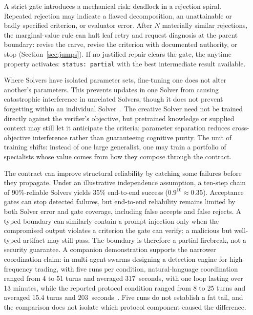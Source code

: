 \documentclass[11pt]{article}
\let\oldtexttt\texttt
\renewcommand{\texttt}[1]{\oldtexttt{\small #1}}
\begin{document}
A strict gate introduces a mechanical risk: deadlock in a rejection spiral. Repeated rejection may indicate a flawed decomposition, an unattainable or badly specified criterion, or evaluator error. After $N$ materially similar rejections, the marginal-value rule can halt leaf retry and request diagnosis at the parent boundary: revise the carve, revise the criterion with documented authority, or stop (Section~\ref{sec:jumps}). If no justified repair clears the gate, the anytime property activates: \texttt{status: partial} with the best intermediate result available.

Where Solvers have isolated parameter sets, fine-tuning one does not alter another's parameters. This prevents updates in one Solver from causing catastrophic interference in unrelated Solvers, though it does not prevent forgetting within an individual Solver~\cite{mccloskey1989}. The creative Solver need not be trained directly against the verifier's objective, but pretrained knowledge or supplied context may still let it anticipate the criteria; parameter separation reduces cross-objective interference rather than guaranteeing cognitive purity. The unit of training shifts: instead of one large generalist, one may train a portfolio of specialists whose value comes from how they compose through the contract.

The contract can improve structural reliability by catching some failures before they propagate. Under an illustrative independence assumption, a ten-step chain of 90\%-reliable Solvers yields 35\% end-to-end success ($0.9^{10} \approx 0.35$). Acceptance gates can stop detected failures, but end-to-end reliability remains limited by both Solver error and gate coverage, including false accepts and false rejects. A typed boundary can similarly contain a prompt injection only when the compromised output violates a criterion the gate can verify; a malicious but well-typed artifact may still pass. The boundary is therefore a partial firebreak, not a security guarantee. A companion demonstration supports the narrower coordination claim: in multi-agent swarms designing a detection engine for high-frequency trading, with five runs per condition, natural-language coordination ranged from 4 to 51 turns and averaged 317~seconds, with one loop lasting over 13 minutes, while the reported protocol condition ranged from 8 to 25 turns and averaged 15.4 turns and 203~seconds~\cite{westerberg2026sema}. Five runs do not establish a fat tail, and the comparison does not isolate which protocol component caused the difference.
\end{document}
